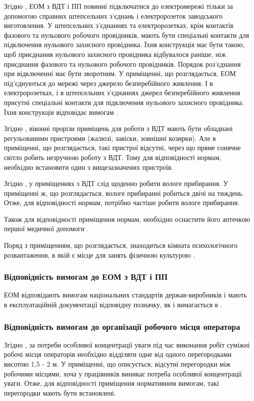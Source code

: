 \documentclass[a4paper,12pt]{article}
\begin{document}
Згідно \cite{npaop1210}, ЕОМ з ВДТ і ПП повинні підключатися до електромережі тільки за допомогою справних штепсельних з'єднань і електророзеток заводського виготовлення. У штепсельних з'єднаннях та електророзетках, крім контактів фазового та нульового робочого провідників, мають бути спеціальні контакти для підключення нульового захисного провідника. Їхня конструкція має бути такою, щоб приєднання нульового захисного провідника відбувалося раніше, ніж приєднання фазового та нульового робочого провідників. Порядок роз'єднання при відключенні має бути зворотним. У приміщенні, що розглядається, ЕОМ під’єднуються до мережі через джерело безперебійного живлення. І в електророзетках, і в штепсельних з’єднаннях джерел безперебійного живлення присутні спеціальні контакти для підключення нульового захисного провідника. Їхня конструкція відповідає вимогам \cite{npaop1210}.

Згідно \cite{sanpin798}, віконні прорізи приміщень для роботи з ВДТ мають бути обладнані регульованими пристроями (жалюзі, завіски, зовнішні козирки). Але в приміщенні, що розглядається, такі пристрої відсутні, через що пряме сонячне світло робить незручною роботу з ВДТ. Тому для відповідності нормам, необхідно встановити один з вищезазначених пристроїв.

Згідно \cite{sanpin798}, у приміщеннях з ВДТ слід щоденно робити вологе прибирання. У приміщенні ж, що розглядається, вологе прибиранні робиться двічі на тиждень. Отже, для відповідності нормам, потрібно частіше робити вологе прибирання.

Також для відповідності приміщення нормам, необхідно оснастити його аптечкою першої медичної допомоги \cite{sanpin798}.

Поряд з приміщенням, що розглядається, знаходиться кімната психологічного розвантаження, в якій є місце для занять фізичною культурою \cite{snip}.

\subsubsection{Відповідність вимогам до ЕОМ з ВДТ і ПП}
ЕОМ відповідають вимогам національних стандартів держав-виробників і мають в експлуатаційній документації відповідну позначку, як і вимагається в \cite{npaop1210}.

\subsubsection{Відповідність вимогам до організації робочого місця оператора}
Згідно \cite{npaop1210}, за потреби особливої концентрації уваги під час виконання робіт суміжні робочі місця операторів необхідно відділяти одне від одного перегородками висотою 1,5 - 2 м. У приміщенні, що описується, відсутні перегородки між робочими місцями, хоча у працівників виникає потреба особливої концентрації уваги. Отже, для відповідності приміщення нормативним вимогам, такі перегородки мають бути встановлені.
\end{document}
